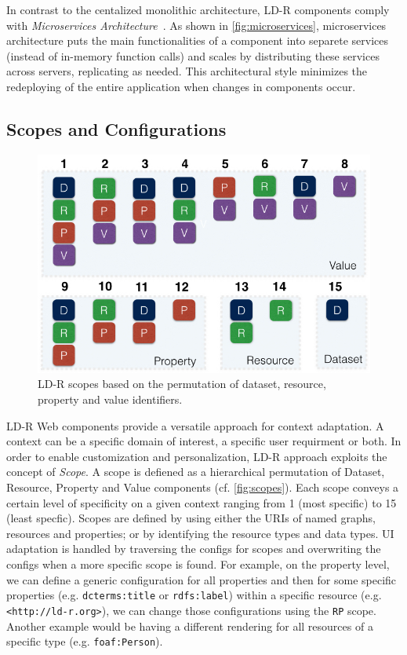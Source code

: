 \documentclass{acm_proc_article-sp}
\begin{document}
In contrast to the centalized monolithic architecture, LD-R components comply with \emph{Microservices Architecture}~\cite{microservices}.
As shown in \autoref{fig:microservices}, microservices architecture puts the main functionalities of a component into separete services (instead of in-memory function calls) and scales by distributing these services across servers, replicating as needed.
This architectural style minimizes the redeploying of the entire application when changes in components occur.



\subsection{Scopes and Configurations}

\begin{figure}[tb]
  \includegraphics[width=.9\linewidth]{images/scopes.jpg}
  \caption{LD-R scopes based on the permutation of dataset, resource, property and value identifiers.}
  \label{fig:scopes}
\end{figure}

LD-R Web components provide a versatile approach for context adaptation.
A context can be a specific domain of interest, a specific user requirment or both.
In order to enable customization and personalization, LD-R approach exploits the concept of \emph{Scope}.
A scope is defiened as a hierarchical permutation of Dataset, Resource, Property and Value components (cf. \autoref{fig:scopes}).
Each scope conveys a certain level of specificity on a given context ranging from 1 (most specific) to 15 (least specfic).
Scopes are defined by using either the URIs of named graphs, resources and properties; or by identifying the resource types and data types.
UI adaptation is handled by traversing the configs for scopes and overwriting the configs when a more specific scope is found.
For example, on the property level, we can define a generic configuration for all properties and then for some specific properties (e.g. \texttt{dcterms:title} or \texttt{rdfs:label}) within a specific resource (e.g. \texttt{<http://ld-r.org>}), we can change those configurations using the \texttt{RP} scope.
Another example would be having a different rendering for all resources of a specific type (e.g. \texttt{foaf:Person}).
\end{document}
